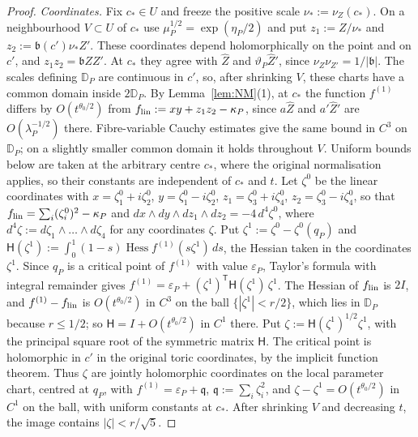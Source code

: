 \begin{proof}
\emph{Coordinates.} Fix $c_*\in U$ and freeze the positive scale $\nu_*:=\nu_Z(c_*)$. On a neighbourhood
$V\subset U$ of $c_*$ use $\mu_P^{1/2}=\exp(\eta_P/2)$ and put $z_1:=Z/\nu_*$ and $z_2:=\mathfrak b(c')\nu_*Z'$. These coordinates depend holomorphically
on the point and on $c'$, and $z_1z_2=\mathfrak bZZ'$. At $c_*$ they agree with $\hat Z$ and
$\vartheta_P\hat Z'$, since $\nu_Z\nu_{Z'}=1/|\mathfrak b|$. The scales defining $\mathbb D_P$ are continuous in
$c'$, so, after shrinking $V$, these charts have a common domain inside $2\mathbb D_P$.
By Lemma~\ref{lem:NM}(1), at $c_*$ the function $f^{(1)}$ differs by $O(t^{\theta_0/2})$ from
$f_{\rm lin}:=xy+z_1z_2-\kappa_P$, since $a\hat Z$ and $a'\hat Z'$ are
$O(\lambda_P^{-1/2})$ there. Fibre-variable Cauchy estimates give the same bound in $C^3$ on $\mathbb D_P$;
on a slightly smaller common domain it holds throughout $V$. Uniform bounds below are taken at the arbitrary
centre $c_*$, where the original normalisation applies, so their constants are independent of $c_*$ and $t$. Let
$\zeta^0$ be the linear coordinates with $x=\zeta^0_1+i\zeta^0_2$, $y=\zeta^0_1-i\zeta^0_2$, $z_1=\zeta^0_3+i\zeta^0_4$,
$z_2=\zeta^0_3-i\zeta^0_4$, so that $f_{\rm lin}=\sum_i(\zeta^0_i)^2-\kappa_P$ and
$dx\wedge dy\wedge dz_1\wedge dz_2=-4\,d^4\zeta^0$, where $d^4\zeta:=d\zeta_1\wedge\dots\wedge d\zeta_4$ for any coordinates
$\zeta$. Put $\zeta^1:=\zeta^0-\zeta^0(q_P)$ and $\mathsf H(\zeta^1):=\int_0^1(1-s)\operatorname{Hess}f^{(1)}(s\zeta^1)\,ds$, the
Hessian taken in the coordinates $\zeta^1$. Since $q_P$ is a critical point of $f^{(1)}$ with value $\varepsilon_P$,
Taylor's formula with integral remainder gives $f^{(1)}=\varepsilon_P+(\zeta^1)^{\mathsf T}\mathsf H(\zeta^1)\,\zeta^1$. The Hessian
of $f_{\rm lin}$ is $2I$, and $f^{(1)}-f_{\rm lin}$ is $O(t^{\theta_0/2})$ in $C^3$ on the ball $\{|\zeta^1|<r/2\}$, which
lies in $\mathbb D_P$ because $r\le1/2$; so $\mathsf H=I+O(t^{\theta_0/2})$ in $C^1$ there. Put $\zeta:=\mathsf H(\zeta^1)^{1/2}\zeta^1$,
with the principal square root of the symmetric matrix $\mathsf H$. The critical point is holomorphic in $c'$ in
the original toric coordinates, by the implicit function theorem. Thus $\zeta$ are jointly holomorphic coordinates
on the local parameter chart, centred at $q_P$, with $f^{(1)}=\varepsilon_P+\mathfrak q$, $\mathfrak q:=\sum_i\zeta_i^2$, and
$\zeta-\zeta^1=O(t^{\theta_0/2})$ in $C^1$ on the ball, with uniform constants at $c_*$.
After shrinking $V$ and decreasing $t$, the image contains $|\zeta|<r/\sqrt5$.


\end{proof}
